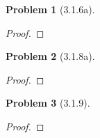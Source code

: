 \documentclass[10pt]{article}
\newcommand{\sk}{\vskip 10mm}
\theoremstyle{plain}
\newtheorem{problem}{Problem}
\theoremstyle{remark}
\begin{document}
\begin{problem}[3.1.6a]
  
\end{problem}

\begin{proof}
  
\end{proof}

\sk

\begin{problem}[3.1.8a]
  
\end{problem}

\begin{proof}
  
\end{proof}

\sk

\begin{problem}[3.1.9]
  
\end{problem}

\begin{proof}
  
\end{proof}

\end{document}
